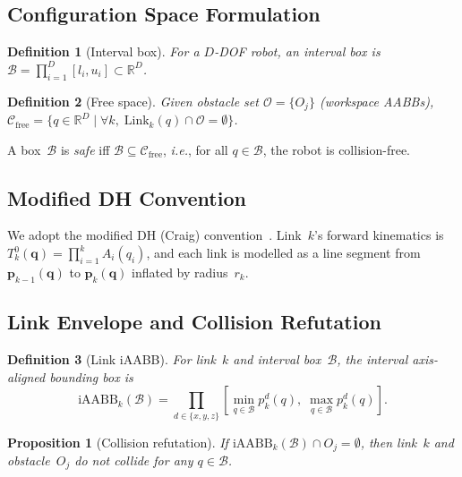 \documentclass[journal]{IEEEtran}
\newtheorem{definition}{Definition}
\newtheorem{proposition}{Proposition}
\newcommand{\Cfree}{\mathcal{C}_\text{free}}
\newcommand{\iAABB}{\text{iAABB}}
\newcommand{\Real}{\mathbb{R}}
\newcommand{\calO}{\mathcal{O}}
\newcommand{\ie}{\textit{i.e.},\xspace}
\begin{document}
\subsection{Configuration Space Formulation}

\begin{definition}[Interval box]
For a $D$-DOF robot, an \emph{interval box} is
$\mathcal{B} = \prod_{i=1}^{D}[l_i, u_i] \subset \Real^D$.
\end{definition}

\begin{definition}[Free space]
Given obstacle set $\calO = \{O_j\}$ (workspace AABBs),
$\Cfree = \{q \in \Real^D \mid \forall k,\;
\mathrm{Link}_k(q) \cap \calO = \emptyset\}$.
\end{definition}

A box~$\mathcal{B}$ is \emph{safe} iff
$\mathcal{B} \subseteq \Cfree$, \ie for all $q \in \mathcal{B}$,
the robot is collision-free.

\subsection{Modified DH Convention}

We adopt the modified DH (Craig) convention~\cite{craig2005introduction}.
Link~$k$'s forward kinematics is
$T_k^0(\bm{q}) = \prod_{i=1}^{k} A_i(q_i)$, and each link is
modelled as a line segment from $\bm{p}_{k-1}(\bm{q})$ to
$\bm{p}_k(\bm{q})$ inflated by radius~$r_k$.

\subsection{Link Envelope and Collision Refutation}

\begin{definition}[Link iAABB]
For link~$k$ and interval box~$\mathcal{B}$, the
\emph{interval axis-aligned bounding box} is
\begin{equation}
\iAABB_k(\mathcal{B}) = \prod_{d \in \{x,y,z\}}
\left[\min_{q \in \mathcal{B}} p_k^d(q),\;
      \max_{q \in \mathcal{B}} p_k^d(q)\right].
\end{equation}
\end{definition}

\begin{proposition}[Collision refutation]
If $\iAABB_k(\mathcal{B}) \cap O_j = \emptyset$, then link~$k$ and
obstacle~$O_j$ do not collide for any $q \in \mathcal{B}$.
\end{proposition}
\end{document}
